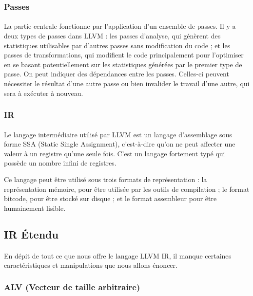 \subsubsection{Passes}
\paragraph{}
La partie centrale fonctionne par l'application d’un ensemble de passes. Il y a
deux types de passes dans LLVM : les passes d’analyse, qui génèrent des
statistiques utilisables par d’autres passes sans modification du code ; et les
passes de transformations, qui modifient le code principalement pour l'optimiser
en se basant potentiellement sur les statistiques générées par le premier type
de passe. On peut indiquer des dépendances entre les passes. Celles-ci peuvent
nécessiter le résultat d’une autre passe ou bien invalider le travail d’une
autre, qui sera à exécuter à nouveau.

\subsubsection{IR}
\paragraph{}
Le langage intermédiaire utilisé par LLVM est un langage d'assemblage sous forme
SSA (Static Single Assignment), c'est-à-dire qu'on ne peut affecter une valeur à
un registre qu'une seule fois. C'est un langage fortement typé qui possède un
nombre infini de registres.

Ce langage peut être utilisé sous trois formats de représentation : la
représentation mémoire, pour être utilisée par les outils de compilation ; le
format bitcode, pour être stocké sur disque ; et le format assembleur pour être
humainement lisible.

\subsection{IR Étendu}
\paragraph{}
En dépit de tout ce que nous offre le langage LLVM IR, il manque certaines
caractéristiques et manipulations que nous allons énoncer.

\subsubsection{ALV (Vecteur de taille arbitraire)}
